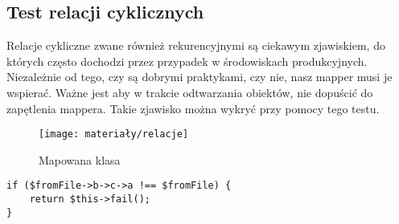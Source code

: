 \subsection{Test relacji cyklicznych}
Relacje cykliczne zwane również rekurencyjnymi są ciekawym zjawiskiem, do których często dochodzi przez przypadek w środowiskach produkcyjnych. Niezależnie od tego, czy są dobrymi praktykami, czy nie, nasz mapper musi je wspierać. Ważne jest aby w trakcie odtwarzania obiektów, nie dopuścić do zapętlenia mappera. Takie zjawisko można wykryć przy pomocy tego testu. 

\begin{figure}[ht]
	\centering
	\texttt{[image: materiały/relacje]}
	\caption{Mapowana klasa}
\end{figure}

\begin{empty}
	\begin{verbatim}
if ($fromFile->b->c->a !== $fromFile) {
	return $this->fail();
}
	\end{verbatim}
	\vspace{-10pt}
\end{empty}
